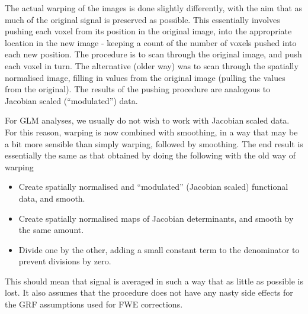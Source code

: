 The actual warping of the images is done slightly differently, with the aim that as much of the original signal is preserved as possible.  This essentially involves pushing each
voxel from its position in the original image, into the appropriate location
in the new image - keeping a count of the number of voxels pushed into each
new position.  The procedure is to scan through the original image, and push
each voxel in turn.  The alternative (older way) was to scan through the
spatially normalised image, filling in values from the original image
(pulling the values from the original).  The results of the pushing procedure
are analogous to Jacobian scaled (``modulated'') data.

For GLM analyses, we usually do not wish to work with Jacobian scaled data.
For this reason, warping is now combined with smoothing, in a way that may be a bit more
sensible than simply warping, followed by smoothing.  The end result is
essentially the same as that obtained by doing the following with the old way of warping
\begin{itemize}
\item{Create spatially normalised and ``modulated'' (Jacobian scaled) functional data, and smooth.}
\item{Create spatially normalised maps of Jacobian determinants, and smooth by the same amount.}
\item{Divide one by the other, adding a small constant term to the denominator to prevent divisions by zero.}
\end{itemize}
This should mean that signal is averaged in such a way that as little as possible
is lost.  It also assumes that the procedure does not have any nasty side
effects for the GRF assumptions used for FWE corrections.

